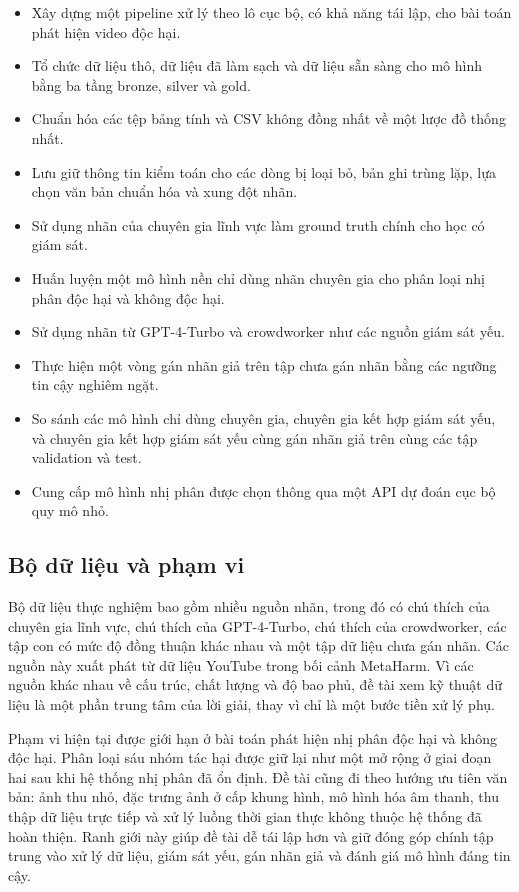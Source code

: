 \begin{itemize}
    \item Xây dựng một pipeline xử lý theo lô cục bộ, có khả năng tái lập, cho bài toán phát hiện video độc hại.
    \item Tổ chức dữ liệu thô, dữ liệu đã làm sạch và dữ liệu sẵn sàng cho mô hình bằng ba tầng bronze, silver và gold.
    \item Chuẩn hóa các tệp bảng tính và CSV không đồng nhất về một lược đồ thống nhất.
    \item Lưu giữ thông tin kiểm toán cho các dòng bị loại bỏ, bản ghi trùng lặp, lựa chọn văn bản chuẩn hóa và xung đột nhãn.
    \item Sử dụng nhãn của chuyên gia lĩnh vực làm ground truth chính cho học có giám sát.
    \item Huấn luyện một mô hình nền chỉ dùng nhãn chuyên gia cho phân loại nhị phân độc hại và không độc hại.
    \item Sử dụng nhãn từ GPT-4-Turbo và crowdworker như các nguồn giám sát yếu.
    \item Thực hiện một vòng gán nhãn giả trên tập chưa gán nhãn bằng các ngưỡng tin cậy nghiêm ngặt.
    \item So sánh các mô hình chỉ dùng chuyên gia, chuyên gia kết hợp giám sát yếu, và chuyên gia kết hợp giám sát yếu cùng gán nhãn giả trên cùng các tập validation và test.
    \item Cung cấp mô hình nhị phân được chọn thông qua một API dự đoán cục bộ quy mô nhỏ.
\end{itemize}

\subsection{Bộ dữ liệu và phạm vi}

Bộ dữ liệu thực nghiệm bao gồm nhiều nguồn nhãn, trong đó có chú thích của chuyên gia lĩnh vực, chú thích của GPT-4-Turbo, chú thích của crowdworker, các tập con có mức độ đồng thuận khác nhau và một tập dữ liệu chưa gán nhãn. Các nguồn này xuất phát từ dữ liệu YouTube trong bối cảnh MetaHarm. Vì các nguồn khác nhau về cấu trúc, chất lượng và độ bao phủ, đề tài xem kỹ thuật dữ liệu là một phần trung tâm của lời giải, thay vì chỉ là một bước tiền xử lý phụ.

Phạm vi hiện tại được giới hạn ở bài toán phát hiện nhị phân độc hại và không độc hại. Phân loại sáu nhóm tác hại được giữ lại như một mở rộng ở giai đoạn hai sau khi hệ thống nhị phân đã ổn định. Đề tài cũng đi theo hướng ưu tiên văn bản: ảnh thu nhỏ, đặc trưng ảnh ở cấp khung hình, mô hình hóa âm thanh, thu thập dữ liệu trực tiếp và xử lý luồng thời gian thực không thuộc hệ thống đã hoàn thiện. Ranh giới này giúp đề tài dễ tái lập hơn và giữ đóng góp chính tập trung vào xử lý dữ liệu, giám sát yếu, gán nhãn giả và đánh giá mô hình đáng tin cậy.


